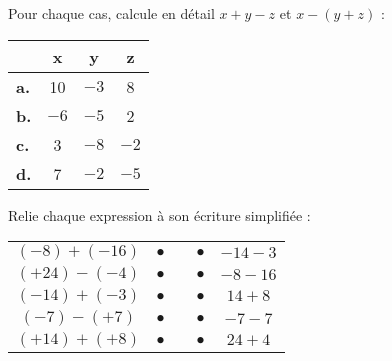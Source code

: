 \begin{exercice}
Pour chaque cas, calcule en détail $x + y - z$ et $x - (y + z)$ :
\begin{center}
\begin{tabularx}{0.4\linewidth}{|X|c|c|c|}
\hline
 & x & y & z \\ \hline
\textbf{a.} & 10 & $-3$ & 8 \\ \hline
\textbf{b.} & $-6$ & $-5$ & 2 \\ \hline
\textbf{c.} & 3 & $-8$ & $-2$ \\ \hline
\textbf{d.} & 7 & $-2$ & $-5$ \\ \hline
 \end{tabularx}
 \end{center}
\end{exercice}

\newpage



\begin{exercice}
Relie chaque expression à son écriture simplifiée :
\begin{center}
 \begin{tabularx}{0.8\linewidth}{|cc|X|cc|}
  \cline{1-2}\cline{4-5}
  $(-8) + (-16)$ & $\bullet$ & & $\bullet$ & $-14 - 3$ \\ \cline{1-2}\cline{4-5}
  $(+24) - (-4)$ & $\bullet$ & & $\bullet$ & $-8 - 16$ \\ \cline{1-2}\cline{4-5}
  $(-14) + (-3)$ & $\bullet$ & & $\bullet$ & $14 + 8$ \\ \cline{1-2}\cline{4-5}
  $(-7) - (+7)$ & $\bullet$ & & $\bullet$ & $-7 - 7$ \\ \cline{1-2}\cline{4-5}
  $(+14) + (+8)$ & $\bullet$ & & $\bullet$ & $24 + 4$ \\ \cline{1-2}\cline{4-5}
  \end{tabularx}
  \end{center}
\end{exercice}


